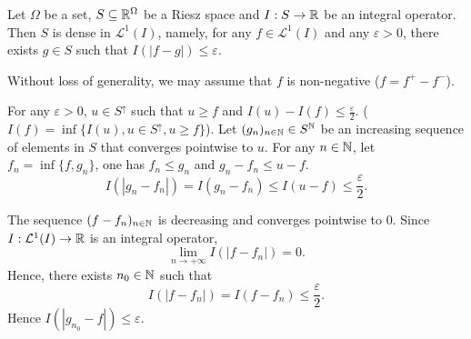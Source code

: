 \begin{lemmaenv}\label{lem:7.2.4}
    Let $\Omega$ be a set, $S \subseteq \mathbb{R}^\Omega$ be a Riesz space and $I : S \rightarrow \mathbb{R}$ be an integral operator.
    Then $S$ is dense in $\mathcal{L}^{1}(I)$,
    namely, for any $f \in \mathcal{L}^{1}(I)$ and any $\varepsilon > 0$,
    there exists $g \in S$ such that $I(|f - g|) \le \varepsilon$.
\end{lemmaenv}
\begin{proofenv}
    Without loss of generality, we may assume that $f$ is non-negative ($f = f^+ - f^-$).
    
    For any $\varepsilon > 0$, $u \in S^\uparrow$ such that $u \ge f$ and $I(u) - I(f) \le \frac{\varepsilon}{2}$.
    ($I(f) = \inf \{I(u), u\in S^\uparrow, u\ge f\}$).
    Let $(g_n)_{n \in \mathbb{N}} \in S^{\mathbb{N}}$ be an increasing sequence of elements in $S$ that converges pointwise to $u$.
    For any $n \in \mathbb{N}$, let $f_n = \inf\{f, g_n\}$,
    one has $f_n \le g_n$ and $g_n - f_n \le u - f$.
    $$I(|g_n - f_n|) = I(g_n - f_n) \le I(u - f) \le \frac{\varepsilon}{2}.$$

    The sequence $(f - f_n)_{n \in \mathbb{N}}$ is decreasing and converges pointwise to $0$.
    Since $I : \mathcal{L}^{1}(I) \rightarrow \mathbb{R}$ is an integral operator,
    $$\lim_{n \rightarrow +\infty} I(|f - f_n|) = 0.$$
    Hence, there exists $n_0 \in \mathbb{N}$ such that 
    $$I(|f - f_n|) = I(f - f_n) \le \frac{\varepsilon}{2}.$$
    Hence $I(|g_{n_0} - f|) \le \varepsilon$.
\end{proofenv}

